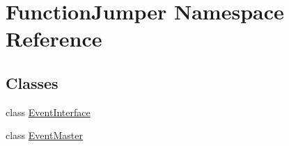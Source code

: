 \hypertarget{namespace_function_jumper}{}\section{Function\+Jumper Namespace Reference}
\label{namespace_function_jumper}
\subsection*{Classes}
\begin{DoxyCompactItemize}
\item 
class \hyperlink{class_function_jumper_1_1_event_interface}{Event\+Interface}
\item 
class \hyperlink{class_function_jumper_1_1_event_master}{Event\+Master}
\end{DoxyCompactItemize}
